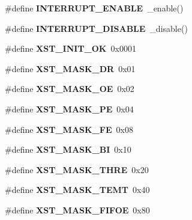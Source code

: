 \begin{DoxyCompactItemize}
\#define {\bfseries I\+N\+T\+E\+R\+R\+U\+P\+T\+\_\+\+E\+N\+A\+B\+LE}~\+\_\+enable()
\item 
\mbox{\label{group__hal__dos_ga658c3ad175b50000ac44b3b9ea836d1a}} 
\#define {\bfseries I\+N\+T\+E\+R\+R\+U\+P\+T\+\_\+\+D\+I\+S\+A\+B\+LE}~\+\_\+disable()
\item 
\mbox{\label{group__hal__dos_gac0bb5dfc7862723940463fc4f534a2c6}} 
\#define {\bfseries X\+S\+T\+\_\+\+I\+N\+I\+T\+\_\+\+OK}~0x0001
\item 
\mbox{\label{group__hal__dos_ga4a10627ecbaf4dd77aae7f9edb4a54f4}} 
\#define {\bfseries X\+S\+T\+\_\+\+M\+A\+S\+K\+\_\+\+DR}~0x01
\item 
\mbox{\label{group__hal__dos_gaacce3cb69756eab817972ff8facdda96}} 
\#define {\bfseries X\+S\+T\+\_\+\+M\+A\+S\+K\+\_\+\+OE}~0x02
\item 
\mbox{\label{group__hal__dos_gab800504524b4de7eea0d273db77f6156}} 
\#define {\bfseries X\+S\+T\+\_\+\+M\+A\+S\+K\+\_\+\+PE}~0x04
\item 
\mbox{\label{group__hal__dos_gaff4d8f56c8de5ecfdba8ded318c2717e}} 
\#define {\bfseries X\+S\+T\+\_\+\+M\+A\+S\+K\+\_\+\+FE}~0x08
\item 
\mbox{\label{group__hal__dos_ga0ca1fda9d4b7f78e3e5a6d4cc3f6ae85}} 
\#define {\bfseries X\+S\+T\+\_\+\+M\+A\+S\+K\+\_\+\+BI}~0x10
\item 
\mbox{\label{group__hal__dos_ga50f54b3db3391cfe1d6eced271e265e9}} 
\#define {\bfseries X\+S\+T\+\_\+\+M\+A\+S\+K\+\_\+\+T\+H\+RE}~0x20
\item 
\mbox{\label{group__hal__dos_ga82f8805477291e063bd3f555f9916cba}} 
\#define {\bfseries X\+S\+T\+\_\+\+M\+A\+S\+K\+\_\+\+T\+E\+MT}~0x40
\item 
\mbox{\label{group__hal__dos_ga646ea2f68b9f1418a33cd38384576cc9}} 
\#define {\bfseries X\+S\+T\+\_\+\+M\+A\+S\+K\+\_\+\+F\+I\+F\+OE}~0x80
\item 
\mbox{\label{group__hal__dos_ga503caf44f78cc52dc196c413cd6c78ab}} 

\end{DoxyCompactItemize}
